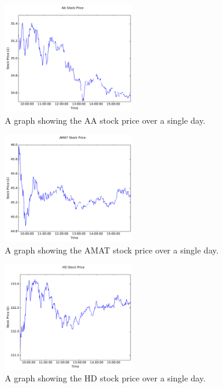 \documentclass[conference]{IEEEtran}
\begin{document}

\begin{figure}
\includegraphics[width=0.5\textwidth, angle=0]{AA.pdf}
\caption{A graph showing the AA stock price over a single day.}
\label{fig:AA Stock Price}
\end{figure}

\begin{figure}
\includegraphics[width=0.5\textwidth, angle=0]{AMAT.pdf}
\caption{A graph showing the AMAT stock price over a single day.}
\label{fig:AMAT Stock Price}
\end{figure}

\begin{figure}
\includegraphics[width=0.5\textwidth, angle=0]{HD.pdf}
\caption{A graph showing the HD stock price over a single day.}
\label{fig:HD Stock Price}
\end{figure}
\end{document}
